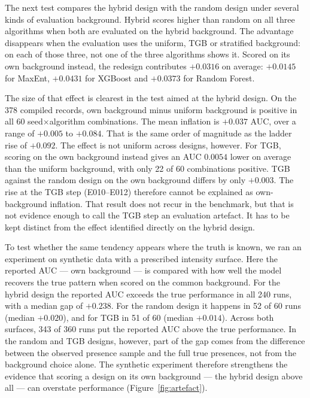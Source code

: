 \documentclass[12pt]{article}
\begin{document}
The next test compares the hybrid design with the random design under several kinds of evaluation background.
Hybrid scores higher than random on all three algorithms when both are evaluated on the hybrid background.
The advantage disappears when the evaluation uses the uniform, TGB or stratified background: on each of those three, not one of the three algorithms shows it.
Scored on its own background instead, the redesign contributes $+0.0316$ on average: $+0.0145$ for MaxEnt, $+0.0431$ for XGBoost and $+0.0373$ for Random Forest.

The size of that effect is clearest in the test aimed at the hybrid design.
On the 378 compiled records, own background minus uniform background is positive in all 60 seed$\times$algorithm combinations.
The mean inflation is $+0.037$ AUC, over a range of $+0.005$ to $+0.084$.
That is the same order of magnitude as the ladder rise of $+0.092$.
The effect is not uniform across designs, however.
For TGB, scoring on the own background instead gives an AUC $0.0054$ lower on average than the uniform background, with only 22 of 60 combinations positive.
TGB against the random design on the own background differs by only $+0.003$.
The rise at the TGB step (E010--E012) therefore cannot be explained as own-background inflation.
That result does not recur in the benchmark, but that is not evidence enough to call the TGB step an evaluation artefact.
It has to be kept distinct from the effect identified directly on the hybrid design.

To test whether the same tendency appears where the truth is known, we ran an experiment on synthetic data with a prescribed intensity surface.
Here the reported AUC --- own background --- is compared with how well the model recovers the true pattern when scored on the common background.
For the hybrid design the reported AUC exceeds the true performance in all 240 runs, with a median gap of $+0.238$.
For the random design it happens in 52 of 60 runs (median $+0.020$), and for TGB in 51 of 60 (median $+0.014$).
Across both surfaces, 343 of 360 runs put the reported AUC above the true performance.
In the random and TGB designs, however, part of the gap comes from the difference between the observed presence sample and the full true presences, not from the background choice alone.
The synthetic experiment therefore strengthens the evidence that scoring a design on its own background --- the hybrid design above all --- can overstate performance (Figure~\ref{fig:artefact}).
\end{document}

